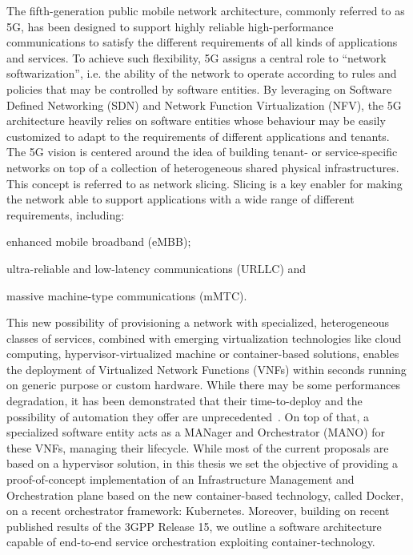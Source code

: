 The fifth-generation public mobile network architecture, commonly referred to as
5G, has been designed to support highly reliable high-performance communications
to satisfy the different requirements of all kinds of applications and services.
To achieve such flexibility, 5G assigns a central role to “network
softwarization”, i.e. the ability of the network to operate according to rules
and policies that may be controlled by software entities. By leveraging on
Software Defined Networking (SDN) and Network Function Virtualization (NFV), the
5G architecture heavily relies on software entities whose behaviour may be
easily customized to adapt to the requirements of different applications and
tenants. The 5G vision is centered around the idea of building tenant- or
service-specific networks on top of a collection of heterogeneous shared
physical infrastructures. This concept is referred to as network slicing.
Slicing is a key enabler for making the network able to support applications
with a wide range of different requirements, including:
\begin{enumerate*}[label=(\roman*)]
\item enhanced mobile broadband (eMBB);
\item ultra-reliable and low-latency communications (URLLC) and
\item massive machine-type communications (mMTC).
\end{enumerate*}

This new possibility of provisioning a network with specialized, heterogeneous
classes of services, combined with emerging virtualization technologies like
cloud computing, hypervisor-virtualized machine or container-based solutions,
enables the deployment of Virtualized Network Functions (VNFs) within seconds
running on generic purpose or custom hardware. While there may be some
performances degradation, it has been demonstrated that their time-to-deploy and
the possibility of automation they offer are unprecedented~\cite{nguyen2017sdn}.
On top of that, a specialized software entity acts as a MANager and Orchestrator
(MANO) for these VNFs, managing their lifecycle. While most of the current
proposals are based on a hypervisor solution, in this thesis we set the
objective of providing a proof-of-concept implementation of an Infrastructure
Management and Orchestration plane based on the new container-based technology,
called Docker, on a recent orchestrator framework: Kubernetes. Moreover,
building on recent published results of the 3GPP Release 15, we outline a
software architecture capable of end-to-end service orchestration exploiting
container-technology.
 
